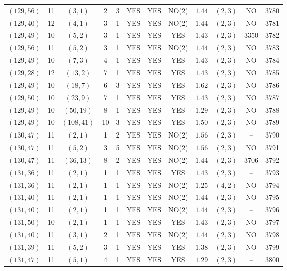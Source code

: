 \begin{longtable}{|c|c|c|c|c|c|c|c|c|c|c|c|}
$(129,56)$ & 11 & $(3,1)$ & 2 & 3 & YES & YES & NO(2) & $1.44$ & $(2,3)$ & NO & 3780\\
$(129,40)$ & 12 & $(4,1)$ & 3 & 1 & YES & YES & NO(2) & $1.44$ & $(2,3)$ & NO & 3781\\
$(129,49)$ & 10 & $(5,2)$ & 3 & 1 & YES & YES & YES & $1.43$ & $(2,3)$ & 3350 & 3782\\
$(129,56)$ & 11 & $(5,2)$ & 3 & 1 & YES & YES & NO(2) & $1.44$ & $(2,3)$ & NO & 3783\\
$(129,49)$ & 10 & $(7,3)$ & 4 & 1 & YES & YES & YES & $1.43$ & $(2,3)$ & NO & 3784\\
$(129,28)$ & 12 & $(13,2)$ & 7 & 1 & YES & YES & YES & $1.43$ & $(2,3)$ & NO & 3785\\
$(129,49)$ & 10 & $(18,7)$ & 6 & 3 & YES & YES & YES & $1.62$ & $(2,3)$ & NO & 3786\\
$(129,50)$ & 10 & $(23,9)$ & 7 & 1 & YES & YES & YES & $1.43$ & $(2,3)$ & NO & 3787\\
$(129,49)$ & 10 & $(50,19)$ & 8 & 1 & YES & YES & YES & $1.29$ & $(2,3)$ & NO & 3788\\
$(129,49)$ & 10 & $(108,41)$ & 10 & 3 & YES & YES & YES & $1.50$ & $(2,3)$ & NO & 3789\\
$(130,47)$ & 11 & $(2,1)$ & 1 & 2 & YES & YES & NO(2) & $1.56$ & $(2,3)$ & -- & 3790\\
$(130,47)$ & 11 & $(5,2)$ & 3 & 5 & YES & YES & NO(2) & $1.56$ & $(2,3)$ & NO & 3791\\
$(130,47)$ & 11 & $(36,13)$ & 8 & 2 & YES & YES & NO(2) & $1.44$ & $(2,3)$ & 3706 & 3792\\
$(131,36)$ & 11 & $(2,1)$ & 1 & 1 & YES & YES & YES & $1.43$ & $(2,3)$ & -- & 3793\\
$(131,36)$ & 11 & $(2,1)$ & 1 & 1 & YES & YES & NO(2) & $1.25$ & $(4,2)$ & NO & 3794\\
$(131,40)$ & 11 & $(2,1)$ & 1 & 1 & YES & YES & NO(2) & $1.44$ & $(2,3)$ & NO & 3795\\
$(131,40)$ & 11 & $(2,1)$ & 1 & 1 & YES & YES & NO(2) & $1.44$ & $(2,3)$ & -- & 3796\\
$(131,50)$ & 10 & $(2,1)$ & 1 & 1 & YES & YES & YES & $1.43$ & $(2,3)$ & NO & 3797\\
$(131,40)$ & 11 & $(3,1)$ & 2 & 1 & YES & YES & NO(2) & $1.44$ & $(2,3)$ & NO & 3798\\
$(131,39)$ & 11 & $(5,2)$ & 3 & 1 & YES & YES & YES & $1.38$ & $(2,3)$ & NO & 3799\\
$(131,47)$ & 11 & $(5,1)$ & 4 & 1 & YES & YES & YES & $1.29$ & $(2,3)$ & -- & 3800\\

\end{longtable}
